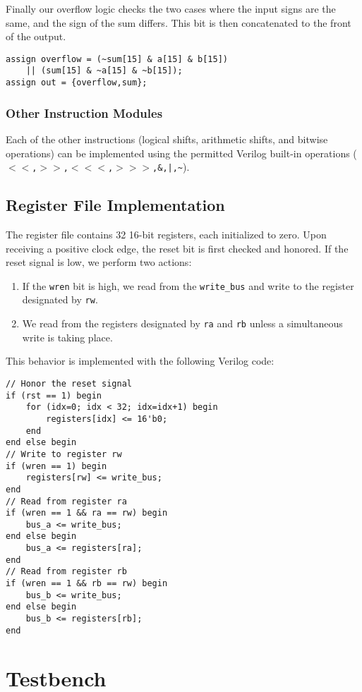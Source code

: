 \documentclass[11pt]{article}
\begin{document}
Finally our overflow logic checks the two cases where the input signs are the same, and the sign of the sum differs. This bit is then concatenated to the front of the output.

\begin{lstlisting}
assign overflow = (~sum[15] & a[15] & b[15]) 
	|| (sum[15] & ~a[15] & ~b[15]);
assign out = {overflow,sum};
\end{lstlisting}

\subsubsection{Other Instruction Modules}
Each of the other instructions (logical shifts, arithmetic shifts, and bitwise operations) can be implemented using the permitted Verilog built-in operations (\texttt{$<<$,$>>$,$<<<$,$>>>$,\&,|,\sim}).

\subsection{Register File Implementation}
The register file contains 32 16-bit registers, each initialized to zero. Upon receiving a positive clock edge, the reset bit is first checked and honored. If the reset signal is low, we perform two actions:
\begin{enumerate}
	\item If the \texttt{wren} bit is high, we read from the \texttt{write\_bus} and write to the register designated by \texttt{rw}.
	
	\item We read from the registers designated by \texttt{ra} and \texttt{rb} unless a simultaneous write is taking place.
\end{enumerate}

This behavior is implemented with the following Verilog code:
\begin{lstlisting}
// Honor the reset signal
if (rst == 1) begin
	for (idx=0; idx < 32; idx=idx+1) begin
		registers[idx] <= 16'b0;
	end
end else begin
// Write to register rw
if (wren == 1) begin
	registers[rw] <= write_bus;
end 
// Read from register ra
if (wren == 1 && ra == rw) begin
	bus_a <= write_bus;
end else begin
	bus_a <= registers[ra];
end
// Read from register rb
if (wren == 1 && rb == rw) begin
	bus_b <= write_bus;
end else begin
	bus_b <= registers[rb];
end
\end{lstlisting}

\section{Testbench}
\end{document}
